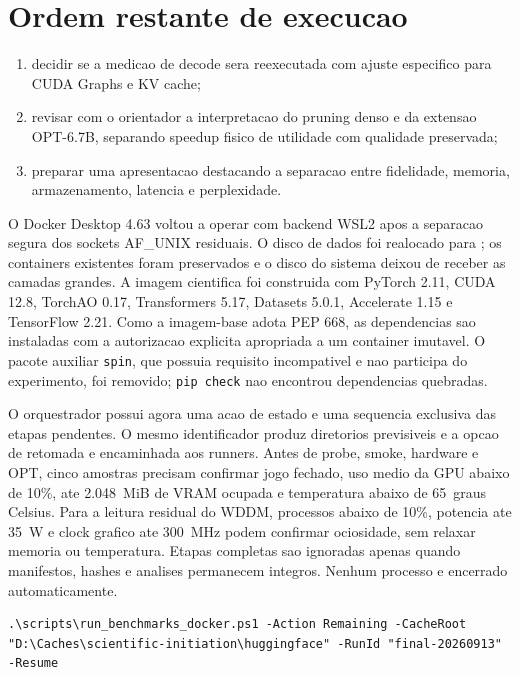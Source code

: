\section{Ordem restante de execucao}

\begin{enumerate}
  \item decidir se a medicao de decode sera reexecutada com ajuste especifico para CUDA Graphs e KV cache;
  \item revisar com o orientador a interpretacao do pruning denso e da extensao OPT-6.7B, separando speedup fisico de utilidade com qualidade preservada;
  \item preparar uma apresentacao destacando a separacao entre fidelidade, memoria, armazenamento, latencia e perplexidade.
\end{enumerate}

O Docker Desktop 4.63 voltou a operar com backend WSL2 apos a separacao segura
dos sockets AF\_UNIX residuais. O disco de dados foi realocado para
; os containers existentes foram preservados e o
disco do sistema deixou de receber as camadas grandes. A imagem cientifica foi
construida com PyTorch 2.11, CUDA 12.8, TorchAO 0.17, Transformers 5.17,
Datasets 5.0.1, Accelerate 1.15 e TensorFlow 2.21. Como a imagem-base adota PEP
668, as dependencias sao instaladas com a autorizacao explicita apropriada a um
container imutavel. O pacote auxiliar \texttt{spin}, que possuia requisito
incompativel e nao participa do experimento, foi removido; \texttt{pip check}
nao encontrou dependencias quebradas.

O orquestrador possui agora uma acao de estado e uma sequencia exclusiva das
etapas pendentes. O mesmo identificador produz diretorios previsiveis e a opcao
de retomada e encaminhada aos runners. Antes de probe, smoke, hardware e OPT,
cinco amostras precisam confirmar jogo fechado, uso medio da GPU abaixo de 10\%,
ate 2.048~MiB de VRAM ocupada e temperatura abaixo de 65~graus Celsius. Para a
leitura residual do WDDM, processos abaixo de 10\%, potencia ate 35~W e clock
grafico ate 300~MHz podem confirmar ociosidade, sem relaxar memoria ou
temperatura. Etapas completas sao ignoradas apenas quando manifestos, hashes e
analises permanecem integros. Nenhum processo e encerrado automaticamente.

\begin{Verbatim}[fontsize=\small,breaklines=true,label=powershell]
.\scripts\run_benchmarks_docker.ps1 -Action Remaining -CacheRoot "D:\Caches\scientific-initiation\huggingface" -RunId "final-20260913" -Resume
\end{Verbatim}

